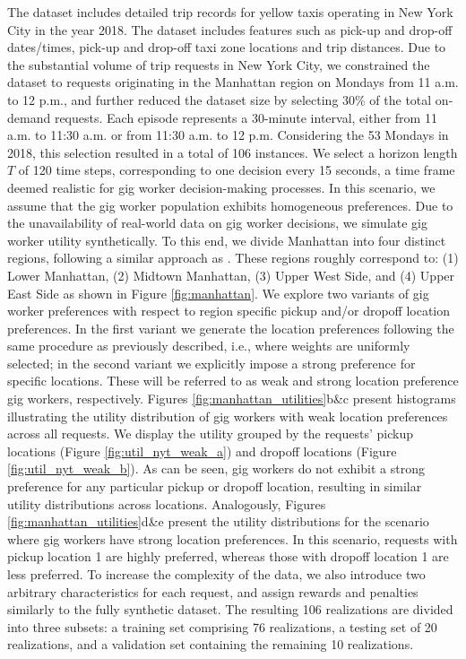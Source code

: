 The \cite{NYTdata} dataset includes detailed trip records for yellow taxis operating in New York City in the year 2018. The dataset includes features such as pick-up and drop-off dates/times, pick-up and drop-off taxi zone locations and trip distances. Due to the substantial volume of trip requests in New York City, we constrained the dataset to requests originating in the Manhattan region on Mondays from 11 a.m. to 12 p.m., and further reduced the dataset size by selecting 30\% of the total on-demand requests. Each episode represents a 30-minute interval, either from 11 a.m. to 11:30 a.m. or from 11:30 a.m. to 12 p.m. Considering the 53 Mondays in 2018, this selection resulted in a total of 106 instances. We select a horizon length $T$ of 120 time steps, corresponding to one decision every 15 seconds, a time frame deemed realistic for gig worker decision-making processes. In this scenario, we assume that the gig worker population exhibits homogeneous preferences. Due to the unavailability of real-world data on gig worker decisions, we simulate gig worker utility synthetically. To this end, we divide Manhattan into four distinct regions, following a similar approach as \cite{yahia2021book}. These regions roughly correspond to: (1) Lower Manhattan, (2) Midtown Manhattan, (3) Upper West Side, and (4) Upper East Side as shown in Figure \ref{fig:manhattan}. We explore two variants of gig worker preferences with respect to region specific pickup and/or dropoff location preferences. In the first variant we generate the location preferences following the same procedure as previously described, i.e., where weights are uniformly selected; in the second variant we explicitly impose a strong preference for specific locations. These will be referred to as weak and strong location preference gig workers, respectively. Figures \ref{fig:manhattan_utilities}b\&c present histograms illustrating the utility distribution of gig workers with weak location preferences across all requests. We display the utility grouped by the requests' pickup locations (Figure \ref{fig:util_nyt_weak_a}) and dropoff locations (Figure \ref{fig:util_nyt_weak_b}). As can be seen, gig workers do not exhibit a strong preference for any particular pickup or dropoff location, resulting in similar utility distributions across locations. Analogously, Figures \ref{fig:manhattan_utilities}d\&e present the utility distributions for the scenario where gig workers have strong location preferences. In this scenario, requests with pickup location 1 are highly preferred, whereas those with dropoff location 1 are less preferred. To increase the complexity of the data, we also introduce two arbitrary characteristics for each request, and assign rewards and penalties similarly to the fully synthetic dataset. The resulting 106 realizations are divided into three subsets: a training set comprising 76 realizations, a testing set of 20 realizations, and a validation set containing the remaining 10 realizations.

